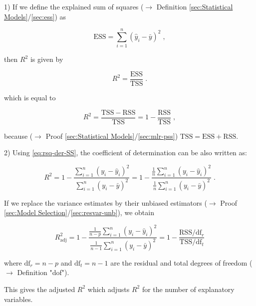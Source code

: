 \documentclass[a4paper,12pt,twoside]{book}
\begin{document}
\vspace{1em}
1) If we define the explained sum of squares ($\rightarrow$ Definition \ref{sec:Statistical Models}/\ref{sec:ess}) as

\begin{equation} \label{eq:rsq-der-ESS}
\mathrm{ESS} = \sum_{i=1}^{n} (\hat{y}_i - \bar{y})^2 \; ,
\end{equation}

then $R^2$ is given by

\begin{equation} \label{eq:rsq-der-R2-s1}
R^2 = \frac{\mathrm{ESS}}{\mathrm{TSS}} \; .
\end{equation}

which is equal to

\begin{equation} \label{eq:rsq-der-R2-s2}
R^2 = \frac{\mathrm{TSS}-\mathrm{RSS}}{\mathrm{TSS}} = 1 - \frac{\mathrm{RSS}}{\mathrm{TSS}} \; ,
\end{equation}

because ($\rightarrow$ Proof \ref{sec:Statistical Models}/\ref{sec:mlr-pss}) $\mathrm{TSS} = \mathrm{ESS} + \mathrm{RSS}$.

\vspace{1em}
2) Using \eqref{eq:rsq-der-SS}, the coefficient of determination can be also written as:

\begin{equation} \label{eq:rsq-der-R2'}
R^2 = 1 - \frac{\sum_{i=1}^{n} (y_i - \hat{y}_i)^2}{\sum_{i=1}^{n} (y_i - \bar{y})^2} = 1 - \frac{\frac{1}{n} \sum_{i=1}^{n} (y_i - \hat{y}_i)^2}{\frac{1}{n} \sum_{i=1}^{n} (y_i - \bar{y})^2} \; .
\end{equation}

If we replace the variance estimates by their unbiased estimators ($\rightarrow$ Proof \ref{sec:Model Selection}/\ref{sec:resvar-unb}), we obtain

\begin{equation} \label{eq:rsq-der-R2-adj'}
R^2_{\mathrm{adj}} = 1 - \frac{\frac{1}{n-p} \sum_{i=1}^{n} (y_i - \hat{y}_i)^2}{\frac{1}{n-1} \sum_{i=1}^{n} (y_i - \bar{y})^2} = 1 - \frac{\mathrm{RSS}/\mathrm{df}_r}{\mathrm{TSS}/\mathrm{df}_t}
\end{equation}

where $\mathrm{df}_r = n-p$ and $\mathrm{df}_t = n-1$ are the residual and total degrees of freedom ($\rightarrow$ Definition "dof").

\vspace{1em}
This gives the adjusted $R^2$ which adjusts $R^2$ for the number of explanatory variables.
\end{document}
